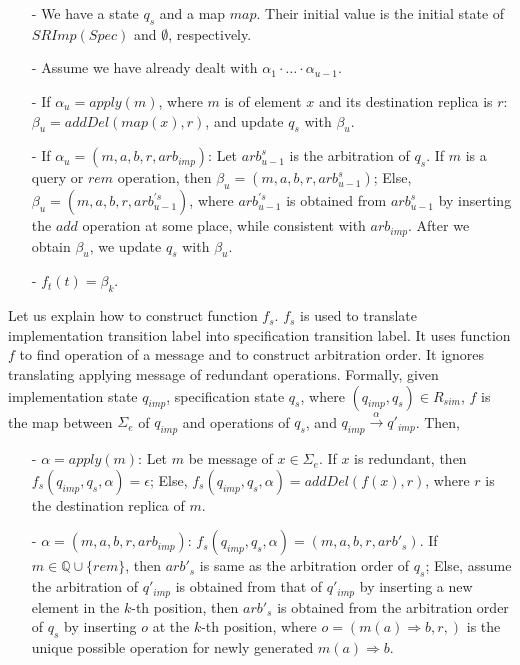 \begin{itemize}
\setlength{\itemsep}{0.5pt}
\item[-] We have a state $q_s$ and a map $\mathit{map}$. Their initial value is the initial state of $SRImp(Spec)$ and $\emptyset$, respectively.

\item[-] Assume we have already dealt with $\alpha_1 \cdot \ldots \cdot \alpha_{u-1}$.

\item[-] If $\alpha_u = apply(m)$, where $m$ is of element $x$ and its destination replica is $r$: $\beta_u = addDel(map(x),r)$, and update $q_s$ with $\beta_u$.

\item[-] If $\alpha_u = (m,a,b,r,\mathit{arb}_{\mathit{imp}})$: Let $\mathit{arb}_{u-1}^s$ is the arbitration of $q_s$. If $m$ is a query or $\mathit{rem}$ operation, then $\beta_u = (m,a,b,r,\mathit{arb}_{u-1}^s)$; Else, $\beta_u = (m,a,b,r,\mathit{arb}_{u-1}^{'s})$, where $\mathit{arb}_{u-1}^{'s}$ is obtained from $\mathit{arb}_{u-1}^s$ by inserting the $add$ operation at some place, while consistent with $\mathit{arb}_{\mathit{imp}}$. After we obtain $\beta_u$, we update $q_s$ with $\beta_u$.

\item[-] $f_t(t) = \beta_k$.
\end{itemize}








Let us explain how to construct function $f_s$. $f_s$ is used to translate implementation transition label into specification transition label. It uses function $f$ to find operation of a message and to construct arbitration order. It ignores translating applying message of redundant operations. Formally, given implementation state $q_{\mathit{imp}}$, specification state $q_s$, where $(q_{\mathit{imp}},q_s) \in R_{\mathit{sim}}$, $f$ is the map between $\Sigma_e$ of $q_{\mathit{imp}}$ and operations of $q_s$, and $q_{\mathit{imp}} {\xrightarrow{\alpha}} q'_{\mathit{imp}}$. Then,

\begin{itemize}
\setlength{\itemsep}{0.5pt}
\item[-] $\alpha = apply(m)$: Let $m$ be message of $x \in \Sigma_e$. If $x$ is redundant, then $f_s(q_{\mathit{imp}},q_s,\alpha) = \epsilon$; Else, $f_s(q_{\mathit{imp}},q_s,\alpha) = addDel(f(x),r)$, where $r$ is the destination replica of $m$.

\item[-] $\alpha = (m,a,b,r,\mathit{arb}_{\mathit{imp}})$: $f_s(q_{\mathit{imp}},q_s,\alpha) = (m,a,b,r,\mathit{arb}'_s)$. If $m \in \mathbb{Q} \cup \{ \mathit{rem} \}$, then $\mathit{arb}'_s$ is same as the arbitration order of $q_s$; Else, assume the arbitration of $q'_{\mathit{imp}}$ is obtained from that of $q'_{\mathit{imp}}$ by inserting a new element in the $k$-th position, then $\mathit{arb}'_s$ is obtained from the arbitration order of $q_s$ by inserting $o$ at the $k$-th position, where $o=(m(a)\Rightarrow b,r,)$ is the unique possible operation for newly generated $m(a)\Rightarrow b$.
\end{itemize}

